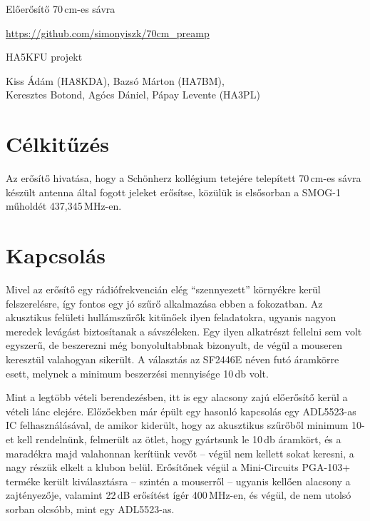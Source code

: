 \begin{center}
	
	\Huge
	Előerősítő 70\,cm-es sávra
	
	\Large
	\url{https://github.com/simonyiszk/70cm_preamp}
	
	\Large
	HA5KFU projekt
	
	\Large
	Kiss Ádám (HA8KDA), Bazsó Márton (HA7BM), \\ Keresztes Botond, Agócs Dániel, Pápay Levente (HA3PL)
\end{center}

\tableofcontents

\listoffigures

\newpage

\section{Célkitűzés}
\label{sec:celkituzes}

Az erősítő hivatása, hogy a Schönherz kollégium tetejére telepített 70\,cm-es sávra készült antenna által fogott jeleket erősítse, közülük is elsősorban a SMOG-1 műholdét 437,345\,MHz-en.


\section{Kapcsolás}
\label{sec:kapcsolas}

Mivel az erősítő egy rádiófrekvencián elég \enquote{szennyezett} környékre kerül felszerelésre, így fontos egy jó szűrő alkalmazása ebben a fokozatban. Az akusztikus felületi hullámszűrők kitűnőek ilyen feladatokra, ugyanis nagyon meredek levágást biztosítanak a sávszéleken. Egy ilyen alkatrészt fellelni sem volt egyszerű, de beszerezni még bonyolultabbnak bizonyult, de végül a mouseren keresztül valahogyan sikerült. A választás az SF2446E\cite{SAW} néven futó áramkörre esett, melynek a minimum beszerzési mennyisége 10\,db volt.

Mint a legtöbb vételi berendezésben, itt is egy alacsony zajú előerősítő kerül a vételi lánc elejére. Előzőekben már épült egy hasonló kapcsolás egy ADL5523\cite{ADL}-as IC felhasználásával, de amikor kiderült, hogy az akusztikus szűrőből minimum 10-et kell rendelnünk, felmerült az ötlet, hogy gyártsunk le 10\,db áramkört, és a maradékra majd valahonnan kerítünk vevőt -- végül nem kellett sokat keresni, a nagy részük elkelt a klubon belül. Erősítőnek végül a Mini-Circuits PGA-103+\cite{PGA} terméke került kiválasztásra -- szintén a mouserről -- ugyanis kellően alacsony a zajtényezője, valamint 22\,dB erősítést ígér 400\,MHz-en, és végül, de nem utolsó sorban olcsóbb, mint egy ADL5523\cite{ADL}-as.

